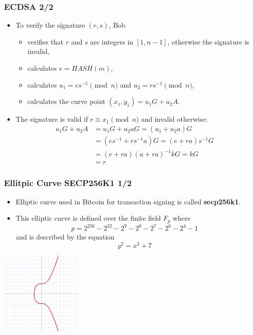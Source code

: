 \documentclass{beamer}
\begin{document}
\begin{frame}
  \frametitle{ECDSA 2/2}
  \begin{itemize}
  \item To verify the signature $(r, s)$, Bob
    \begin{itemize}
    \item verifies that $r$ and $s$ are integers in $[1, n - 1]$, otherwise the
      signature is invalid,
    \item calculates $e = HASH(m)$,
    \item calculates $u_1 = es^{-1} \pmod{n}$ and $u_2 = rs^{-1} \pmod{n}$,
    \item calculates the curve point $(x_1, y_1) = u_1G + u_2A$.
    \end{itemize}
  \item The signature is valid if $r \equiv x_1 \pmod{n}$ and invalid otherwise:
    \begin{align*}
      u_1G + u_2A &= u_1G + u_2aG = (u_1 + u_2a)G \\
                  &= (es^{-1} + rs^{-1}a)G = (e + ra)s^{-1}G \\
                  &= (e + ra)(a + ra)^{-1}kG = kG \\
                  &= r
    \end{align*}
  \end{itemize}
\end{frame}

\begin{frame}
  \frametitle{Ellitpic Curve SECP256K1 1/2}
  \begin{itemize}
  \item Elliptic curve used in Bitcoin for transaction signing is called
    \textbf{secp256k1}.
    
  \item This elliptic curve is defined over the finite field $F_p$ where
    $$p = 2^{256} - 2^{32} - 2^9 - 2^8 - 2^7 - 2^6 - 2^4 - 1$$
    and is described by the equation
    $$y^2 = x^3 + 7$$
  \end{itemize}
  \begin{center}
    \includegraphics[width=0.3\textwidth]{secp256k1}
  \end{center}
\end{frame}
\end{document}
